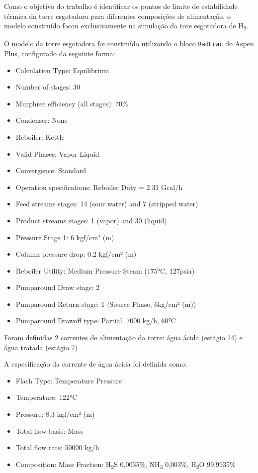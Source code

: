 \documentclass[10pt,a4paper]{article}
\begin{document}
Como o objetivo do trabalho é identificar os pontos de limite de estabilidade térmica da torre esgotadora para diferentes composições de alimentação, o modelo construído focou exclusivamente na  simulação da tore esgotadora de H\textsubscript{2}.

O modelo da torre esgotadora foi construído utilizando o bloco \texttt{RadFrac} do Aspen Plus, configurado da seguinte forma:

\begin{itemize}[leftmargin=4em, itemsep=0pt]
  \item Calculation Type: Equilibrium
  \item Number of stages: 30 
  \item Murphree efficiency (all stages): 70\%
  \item Condenser: None
  \item Reboiler: Kettle
  \item Valid Phases: Vapor-Liquid
  \item Convergence: Standard
  \item Operation specifications: Reboiler Duty = 2.31 Gcal/h
  \item Feed streams stages: 14 (sour water) and 7 (stripped water)
  \item Product streams stages: 1 (vapor) and 30 (liquid)
  \item Pressure Stage 1: 6 kgf/cm² (m)
  \item Column pressure drop: 0.2 kgf/cm² (m)
  \item Reboiler Utility: Medium Pressure Steam (175°C, 127psia)
  \item Pumparound Draw stage: 2
  \item Pumparound Return stage: 1 (Source Phase, 6kg/cm² (m))
  \item Pumparound Drawoff type: Partial. 7000 kg/h, 60°C
\end{itemize}

Foram definidas 2 correntes de alimentação da torre: água ácida (estágio 14) e água tratada (estágio 7)

A especificação da corrente de água ácida foi definida como:

\begin{itemize}[leftmargin=4em, itemsep=0pt]
  \item Flash Type: Temperature Pressure
  \item Temperature: 122°C
  \item Pressure: 8.3 kgf/cm² (m)
  \item Total flow basis: Mass
  \item Total flow rate: 50000 kg/h
  \item Composition: Mass Fraction: H\textsubscript{2}S 0,0035\%, NH\textsubscript{3} 0,003\%, H\textsubscript{2}O 99,9935\%  
\end{itemize}
\end{document}
